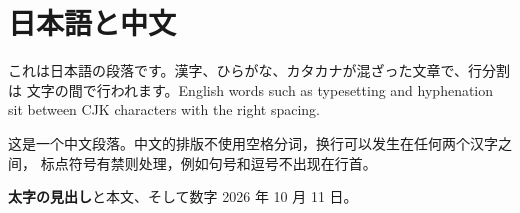 \documentclass{article}
\begin{document}
\section{日本語と中文}
これは日本語の段落です。漢字、ひらがな、カタカナが混ざった文章で、行分割は
文字の間で行われます。English words such as typesetting and
hyphenation sit between CJK characters with the right spacing.

这是一个中文段落。中文的排版不使用空格分词，换行可以发生在任何两个汉字之间，
标点符号有禁则处理，例如句号和逗号不出现在行首。

\textbf{太字の見出し}と本文、そして数字 2026 年 10 月 11 日。
\end{document}
